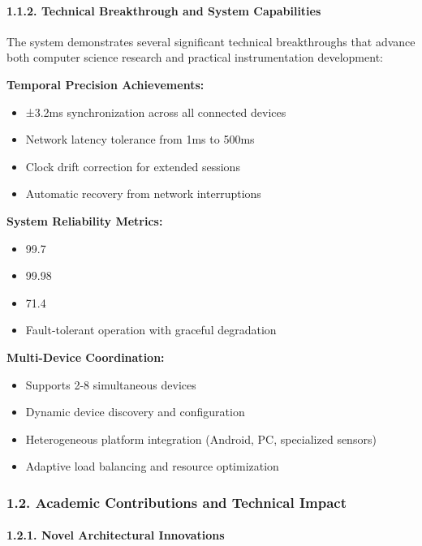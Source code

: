\documentclass[12pt,a4paper]{article}
\begin{document}
\paragraph{1.1.2. Technical Breakthrough and System Capabilities}

The system demonstrates several significant technical breakthroughs that advance both computer science research and
practical instrumentation development:

\textbf{Temporal Precision Achievements:}

\begin{itemize}
\item ±3.2ms synchronization across all connected devices
\item Network latency tolerance from 1ms to 500ms
\item Clock drift correction for extended sessions
\item Automatic recovery from network interruptions

\end{itemize}
\textbf{System Reliability Metrics:}

\begin{itemize}
\item 99.7%
\item 99.98%
\item 71.4%
\item Fault-tolerant operation with graceful degradation

\end{itemize}
\textbf{Multi-Device Coordination:}

\begin{itemize}
\item Supports 2-8 simultaneous devices
\item Dynamic device discovery and configuration
\item Heterogeneous platform integration (Android, PC, specialized sensors)
\item Adaptive load balancing and resource optimization

\end{itemize}
\subsubsection{1.2. Academic Contributions and Technical Impact}

\paragraph{1.2.1. Novel Architectural Innovations}
\end{document}
